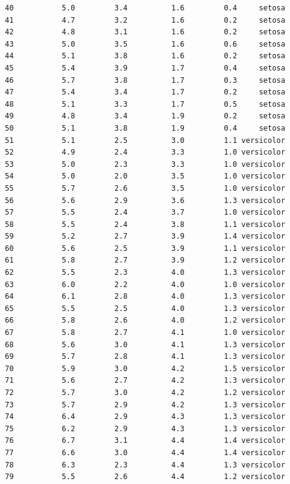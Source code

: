 \documentclass[
  letterpaper,
  DIV=11,
  numbers=noendperiod]{scrartcl}
\begin{document}
\begin{verbatim}
40           5.0         3.4          1.6         0.4     setosa
41           4.7         3.2          1.6         0.2     setosa
42           4.8         3.1          1.6         0.2     setosa
43           5.0         3.5          1.6         0.6     setosa
44           5.1         3.8          1.6         0.2     setosa
45           5.4         3.9          1.7         0.4     setosa
46           5.7         3.8          1.7         0.3     setosa
47           5.4         3.4          1.7         0.2     setosa
48           5.1         3.3          1.7         0.5     setosa
49           4.8         3.4          1.9         0.2     setosa
50           5.1         3.8          1.9         0.4     setosa
51           5.1         2.5          3.0         1.1 versicolor
52           4.9         2.4          3.3         1.0 versicolor
53           5.0         2.3          3.3         1.0 versicolor
54           5.0         2.0          3.5         1.0 versicolor
55           5.7         2.6          3.5         1.0 versicolor
56           5.6         2.9          3.6         1.3 versicolor
57           5.5         2.4          3.7         1.0 versicolor
58           5.5         2.4          3.8         1.1 versicolor
59           5.2         2.7          3.9         1.4 versicolor
60           5.6         2.5          3.9         1.1 versicolor
61           5.8         2.7          3.9         1.2 versicolor
62           5.5         2.3          4.0         1.3 versicolor
63           6.0         2.2          4.0         1.0 versicolor
64           6.1         2.8          4.0         1.3 versicolor
65           5.5         2.5          4.0         1.3 versicolor
66           5.8         2.6          4.0         1.2 versicolor
67           5.8         2.7          4.1         1.0 versicolor
68           5.6         3.0          4.1         1.3 versicolor
69           5.7         2.8          4.1         1.3 versicolor
70           5.9         3.0          4.2         1.5 versicolor
71           5.6         2.7          4.2         1.3 versicolor
72           5.7         3.0          4.2         1.2 versicolor
73           5.7         2.9          4.2         1.3 versicolor
74           6.4         2.9          4.3         1.3 versicolor
75           6.2         2.9          4.3         1.3 versicolor
76           6.7         3.1          4.4         1.4 versicolor
77           6.6         3.0          4.4         1.4 versicolor
78           6.3         2.3          4.4         1.3 versicolor
79           5.5         2.6          4.4         1.2 versicolor

\end{verbatim}
\end{document}
